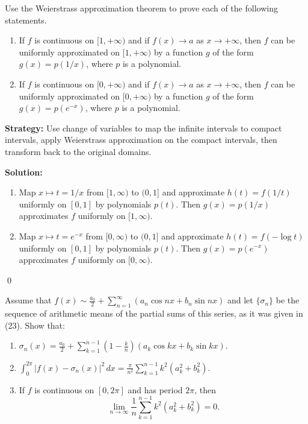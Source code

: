 \begin{problembox}
\begin{problemstatement}
Use the Weierstrass approximation theorem to prove each of the following statements.
\begin{enumerate}[label=(\alph*)]
\item If $f$ is continuous on $[1, +\infty)$ and if $f(x) \to a$ as $x \to +\infty$, then $f$ can be uniformly approximated on $[1, +\infty)$ by a function $g$ of the form $g(x) = p(1/x)$, where $p$ is a polynomial.
\item If $f$ is continuous on $[0, +\infty)$ and if $f(x) \to a$ as $x \to +\infty$, then $f$ can be uniformly approximated on $[0, +\infty)$ by a function $g$ of the form $g(x) = p(e^{-x})$, where $p$ is a polynomial.
\end{enumerate}
\end{problemstatement}
\end{problembox}

\noindent\textbf{Strategy:} Use change of variables to map the infinite intervals to compact intervals, apply Weierstrass approximation on the compact intervals, then transform back to the original domains.

\bigskip\noindent\textbf{Solution:}
\begin{enumerate}[label=(\alph*)]
\item Map $x\mapsto t=1/x$ from $[1,\infty)$ to $(0,1]$ and approximate $h(t)=f(1/t)$ uniformly on $[0,1]$ by polynomials $p(t)$. Then $g(x)=p(1/x)$ approximates $f$ uniformly on $[1,\infty)$.
\item Map $x\mapsto t=e^{-x}$ from $[0,\infty)$ to $(0,1]$ and approximate $h(t)=f(-\log t)$ uniformly on $[0,1]$ by polynomials $p(t)$. Then $g(x)=p(e^{-x})$ approximates $f$ uniformly on $[0,\infty)$.
\end{enumerate}\qed


\begin{problembox}
\begin{problemstatement}
Assume that $f(x) \sim \frac{a_0}{2} + \sum_{n=1}^\infty (a_n \cos nx + b_n \sin nx)$ and let $\{\sigma_n\}$ be the sequence of arithmetic means of the partial sums of this series, as it was given in (23). Show that:
\begin{enumerate}[label=(\alph*)]
\item $\sigma_n(x) = \frac{a_0}{2} + \sum_{k=1}^{n-1} \left(1 - \frac{k}{n}\right) (a_k \cos kx + b_k \sin kx)$.
\item $\int_0^{2\pi} |f(x) - \sigma_n(x)|^2 \, dx = \frac{\pi}{n^2} \sum_{k=1}^{n-1} k^2 (a_k^2 + b_k^2)$.
\item If $f$ is continuous on $[0, 2\pi]$ and has period $2\pi$, then
\[
\lim_{n \to \infty} \frac{1}{n} \sum_{k=1}^{n-1} k^2 (a_k^2 + b_k^2) = 0.
\]
\end{enumerate}
\end{problemstatement}
\end{problembox}

